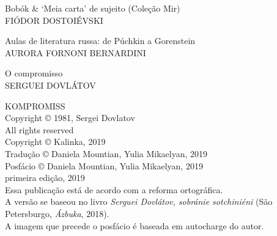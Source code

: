 \noindent{}Bobók \& `Meia carta' de sujeito (Coleção Mir)\\
FIÓDOR DOSTOIÉVSKI
\medskip

\noindent{}Aulas de literatura russa: de Púchkin a Gorenstein \\
AURORA FORNONI BERNARDINI
\medskip

\noindent{}O compromisso\\
SERGUEI DOVLÁTOV

\newpage
\pagestyle{empty}
\MyriadPro
\scriptsize
\begin{center}
KOMPROMISS\\[6pt]

Copyright © 1981, Sergei Dovlatov\\[6pt]

All rights reserved\\[20pt]

Copyright © Kalinka, 2019\\[6pt]

Tradução © Daniela Mountian, Yulia Mikaelyan, 2019\\[6pt]

Posfácio © Daniela Mountian, Yulia Mikaelyan, 2019\\[6pt]

primeira edição, 2019\\[40pt]


Essa publicação está de acordo com a reforma ortográfica.\\[6pt]
A versão se baseou no livro \emph{Serguei Dovlátov, sobránie sotchiniéni} (São Petersburgo, \emph{Ázbuka}, 2018).\\[6pt]	
A imagem que precede o posfácio é baseada em autocharge do autor.\\[20pt]
\end{center}


\bigskip

